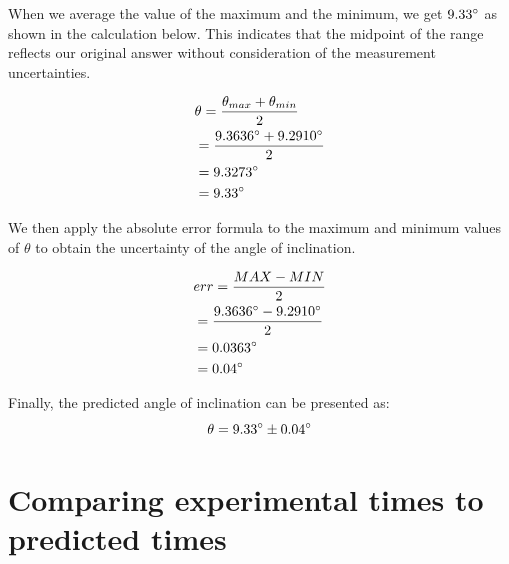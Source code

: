 \documentclass[letterpaper, 12pt]{article}
\begin{document}
    When we average the value of the maximum and the minimum, we get
$9.33\degree$ as shown in the calculation below. This indicates that
    the midpoint of the range reflects our original answer without consideration
    of the measurement uncertainties.

    \begin{align*}
         & \theta = \frac{\theta_{max} + \theta_{min}}{2}
        \\
         & = \frac{9.3636\degree + 9.2910\degree}{2}
        \\
         & = 9.3273\degree
        \\
         & = 9.33\degree
    \end{align*}

    We then apply the absolute error formula to the maximum and minimum values
    of $\theta$ to obtain the uncertainty of the angle of inclination.

\begin{align*}
     & err = \frac{MAX - MIN}{2}
    \\
     & = \frac{9.3636\degree - 9.2910\degree}{2}
    \\
     & = 0.0363\degree
    \\
     & = 0.04\degree
\end{align*}

Finally, the predicted angle of inclination can be presented as:
$$
    \theta = 9.33\degree \pm 0.04\degree
$$

\section{Comparing experimental times to predicted times}
\end{document}
